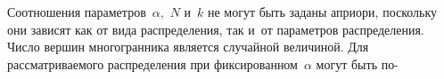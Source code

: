 \begin{multicols}{2}
Соотношения параметров~$\alpha,$ $N$ и~$k$ не могут быть заданы априори, 
поскольку они зависят как от вида распределения, так и~от параметров распределения. 
Число вершин многогранника является случайной величиной. Для рас\-смат\-ри\-ва\-емо\-го 
распределения при фиксированном~$\alpha$ могут быть по-\linebreak\vspace*{-12pt}

\pagebreak

\end{multicols}

\begin{figure*} %
\vspace*{1pt}
 \begin{center}
 \mbox{%
 \epsfxsize=161.751mm 
 }
 \end{center}
\vspace*{-9pt}
\vspace*{6pt}
 \begin{center}
 \mbox{%
 \epsfxsize=162.254mm 
 }
 \end{center}
\vspace*{-9pt}
\end{figure*}

